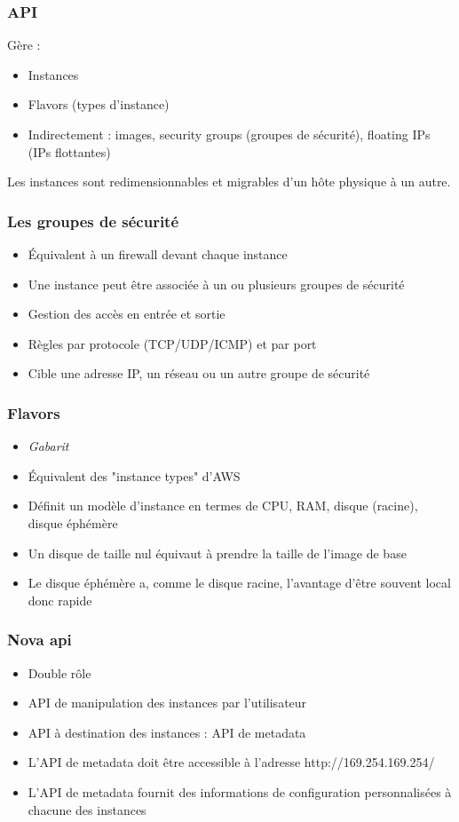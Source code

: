   \begin{frame}
    \frametitle{API}
    Gère :
    \begin{itemize}
      \item Instances
      \item Flavors (types d'instance)
      \item Indirectement : images, security groups (groupes de sécurité), floating IPs (IPs flottantes)
    \end{itemize}
    Les instances sont redimensionnables et migrables d'un hôte physique à un autre.
  \end{frame}

  \begin{frame}
    \frametitle{Les groupes de sécurité}
    \begin{itemize}
      \item Équivalent à un firewall devant chaque instance
      \item Une instance peut être associée à un ou plusieurs groupes de sécurité
      \item Gestion des accès en entrée et sortie
      \item Règles par protocole (TCP/UDP/ICMP) et par port
      \item Cible une adresse IP, un réseau ou un autre groupe de sécurité
    \end{itemize}
  \end{frame}

  \begin{frame}
    \frametitle{Flavors}
    \begin{itemize}
      \item \textit{Gabarit}
      \item Équivalent des "instance types" d'AWS
      \item Définit un modèle d'instance en termes de CPU, RAM, disque (racine), disque éphémère
      \item Un disque de taille nul équivaut à prendre la taille de l'image de base
      \item Le disque éphémère a, comme le disque racine, l'avantage d'être souvent local donc rapide
    \end{itemize}
  \end{frame}

  \begin{frame}
    \frametitle{Nova api}
    \begin{itemize}
      \item Double rôle
      \item API de manipulation des instances par l'utilisateur
      \item API à destination des instances : API de metadata
      \item L'API de metadata doit être accessible à l'adresse http://169.254.169.254/
      \item L'API de metadata fournit des informations de configuration personnalisées à chacune des instances
    \end{itemize}
  \end{frame}

